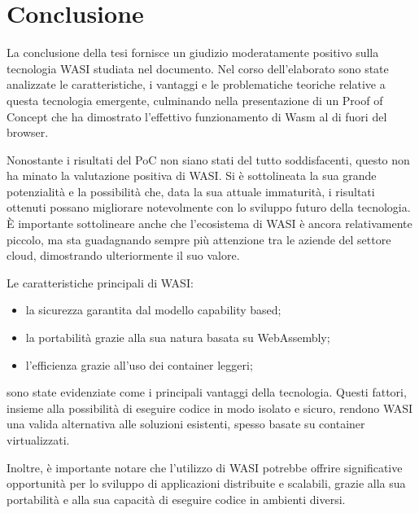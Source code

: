 \chapter{Conclusione}
\label{chap:conclusion}
La conclusione della tesi fornisce un giudizio moderatamente positivo sulla tecnologia WASI studiata nel documento.
Nel corso dell'elaborato sono state analizzate le caratteristiche, i vantaggi e le problematiche teoriche relative a
questa tecnologia emergente, culminando nella presentazione di un Proof of Concept che ha dimostrato l'effettivo
funzionamento di Wasm al di fuori del browser.

Nonostante i risultati del PoC non siano stati del tutto soddisfacenti, questo non ha minato la valutazione positiva di WASI. Si è sottolineata la sua grande potenzialità e la possibilità che, data la sua attuale immaturità, i risultati ottenuti possano migliorare notevolmente con lo sviluppo futuro della tecnologia. È importante sottolineare anche che l'ecosistema di WASI è ancora relativamente piccolo, ma sta guadagnando sempre più attenzione tra le aziende del settore cloud, dimostrando ulteriormente il suo valore.

Le caratteristiche principali di WASI:
\begin{itemize}
    \item la sicurezza garantita dal modello capability based;
    \item la portabilità grazie alla sua natura basata su WebAssembly;
    \item l'efficienza grazie all'uso dei container leggeri;
\end{itemize}

sono state evidenziate come i principali vantaggi della tecnologia. Questi fattori, insieme alla possibilità di eseguire
codice in modo isolato e sicuro, rendono WASI una valida alternativa alle soluzioni esistenti, spesso basate su
container virtualizzati.

Inoltre, è importante notare che l'utilizzo di WASI potrebbe offrire significative opportunità per lo sviluppo di
applicazioni distribuite e scalabili, grazie alla sua portabilità e alla sua capacità di eseguire codice in ambienti
diversi.